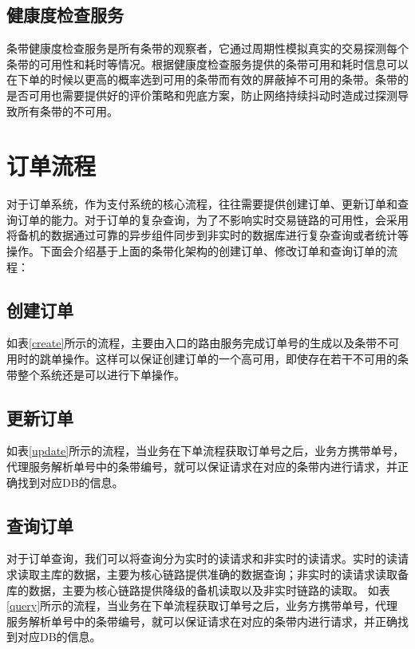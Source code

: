 \documentclass[letterpaper,twocolumn,10pt]{article}
\begin{document}
\subsection{健康度检查服务}
条带健康度检查服务是所有条带的观察者，它通过周期性模拟真实的交易探测每个条带的可用性和耗时等情况。根据健康度检查服务提供的条带可用和耗时信息可以在下单的时候以更高的概率选到可用的条带而有效的屏蔽掉不可用的条带。条带的是否可用也需要提供好的评价策略和兜底方案，防止网络持续抖动时造成过探测导致所有条带的不可用。

\section{订单流程}
对于订单系统，作为支付系统的核心流程，往往需要提供创建订单、更新订单和查询订单的能力。对于订单的复杂查询，为了不影响实时交易链路的可用性，会采用将备机的数据通过可靠的异步组件同步到非实时的数据库进行复杂查询或者统计等操作。下面会介绍基于上面的条带化架构的创建订单、修改订单和查询订单的流程：

\subsection{创建订单}
如表\ref{create}所示的流程，主要由入口的路由服务完成订单号的生成以及条带不可用时的跳单操作。这样可以保证创建订单的一个高可用，即使存在若干不可用的条带整个系统还是可以进行下单操作。

\subsection{更新订单}
如表\ref{update}所示的流程，当业务在下单流程获取订单号之后，业务方携带单号，代理服务解析单号中的条带编号，就可以保证请求在对应的条带内进行请求，并正确找到对应DB的信息。

\subsection{查询订单}
对于订单查询，我们可以将查询分为实时的读请求和非实时的读请求。实时的读请求读取主库的数据，主要为核心链路提供准确的数据查询；非实时的读请求读取备库的数据，主要为核心链路提供降级的备机读取以及非实时链路的读取。
如表\ref{query}所示的流程，当业务在下单流程获取订单号之后，业务方携带单号，代理服务解析单号中的条带编号，就可以保证请求在对应的条带内进行请求，并正确找到对应DB的信息。
\end{document}
